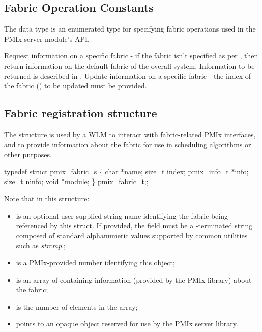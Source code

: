 \subsection{Fabric Operation Constants}

The  data type is an enumerated type for specifying fabric operations used in the \ac{PMIx} server module's  \ac{API}.

\begin{constantdesc}
%
Request information on a specific fabric - if the fabric isn't specified as per , then return information on the default fabric of the overall system. Information to be returned is described in .
%
Update information on a specific fabric - the index of the fabric () to be updated must be provided.
%
\end{constantdesc}

\subsection{Fabric registration structure}

The  structure is used by a \ac{WLM} to interact with fabric-related \ac{PMIx} interfaces, and to provide information about the fabric for use in scheduling algorithms or other purposes.

\cspecificstart
\begin{codepar}
typedef struct pmix_fabric_s \{
    char *name;
    size_t index;
    pmix_info_t *info;
    size_t ninfo;
    void *module;
\} pmix_fabric_t;;
\end{codepar}
\cspecificend

Note that in this structure:

\begin{itemize}
    \item {} is an optional user-supplied string name identifying the fabric being referenced by this struct. If provided, the field must be a -terminated string composed of standard alphanumeric values supported by common utilities such as \textit{strcmp}.;
    \item {} is a \ac{PMIx}-provided number identifying this object;
    \item {} is an array of  containing information (provided by the \ac{PMIx} library) about the fabric;
    \item {} is the number of elements in the  array;
    \item {} points to an opaque object reserved for use by the \ac{PMIx} server library.
\end{itemize}

